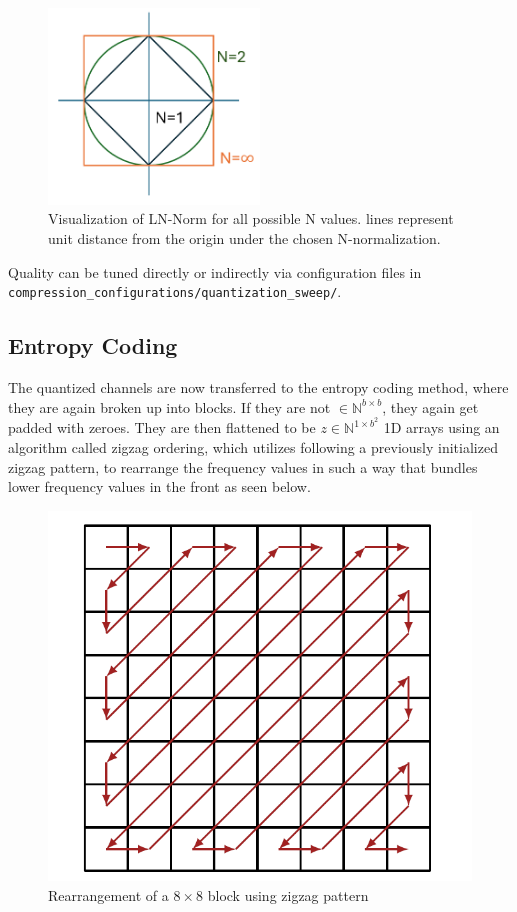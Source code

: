 \begin{figure}
	\includegraphics[width=0.5\textwidth]{assets/LN-Norm.png}
	\caption{Visualization of LN-Norm for all possible N values. lines represent unit distance from the origin under the chosen N-normalization.}
	\label{fig:LN-norm}
\end{figure}
Quality can be tuned directly or indirectly via configuration files in \texttt{compression\_configurations/\allowbreak quantization\_sweep/}.

\subsection{Entropy Coding}
The quantized channels are now transferred to the entropy coding method, where they are again broken up into blocks. If they are not \(\in \mathbb{N}^{b\times b}\), they again get padded with zeroes. They are then flattened to be \(z \in \mathbb{N}^{1\times b^2}\) 1D arrays using an algorithm called zigzag ordering, which utilizes following a previously initialized zigzag pattern, to rearrange the frequency values in such a way that bundles lower frequency values in the front as seen below.

\begin{figure}[H]
	\centering
	\includegraphics[width=0.8\linewidth]{zigzag.png}
	\caption{Rearrangement of a \(8\times8\) block using zigzag pattern}
	\label{fig:zigzag}
\end{figure}

